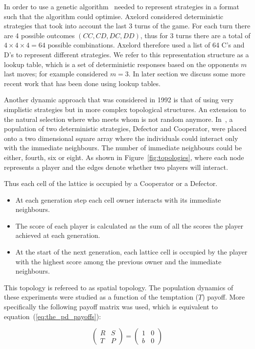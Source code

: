 \documentclass{article}
\theoremstyle{definition}
\begin{document}
In order to use a genetic algorithm~\cite{Axelrod1987} needed to represent strategies
in a format such that the algorithm could optimise. Axelord considered deterministic
strategies that took into account the last 3 turns of the game. For each turn
there are 4 possible outcomes \((CC, CD, DC, DD)\), thus for 3 turns there are a total
of \(4\times4\times4=64\) possible combinations. Axelord therefore used a list of 64 C's and D's
to represent different strategies. We refer to this representation structure as a
lookup table, which is a set of deterministic responses based on
the opponents \(m\) last moves; for example \cite{Axelrod1987} considered \(m=3\).
In later section we discuss some more recent work that has been done using lookup
tables.

Another dynamic approach that was considered in 1992 is that of using very simplistic
strategies but in more complex topological structures. An extension to the natural selection
where who meets whom is not random anymore. In~\cite{Nowak1992b}, a population
of two deterministic strategies, Defector and Cooperator, were placed onto a two
dimensional square array where the individuals could interact only with the immediate
neighbours. The number of immediate neighbours could be either, fourth, six or eight. As
shown in Figure~\ref{fig:topologies}, where each node represents a player and the
edges denote whether two players will interact.

Thus each cell of the lattice is occupied by a Cooperator or a Defector.
\begin{itemize}
    \item At each generation step each cell owner interacts with its immediate neighbours.
    \item The score of each player is calculated as the sum of all the scores the player
    achieved at each generation.
    \item At the start of the next generation, each lattice
    cell is occupied by the player with the highest score among the previous owner
    and the immediate neighbours.
\end{itemize}

This topology is refereed to as spatial topology. The population dynamics of these
experiments were studied as a function of the temptation (\(T\)) payoff.
More specifically the following payoff matrix was used, which is equivalent
to equation~(\ref{eq:the_pd_payoffs}):

\begin{equation}
    \begin{pmatrix}
    R & S \\ T & P
    \end{pmatrix}
    =
    \begin{pmatrix}
        1 & 0 \\ b & 0
    \end{pmatrix}
\end{equation}
\end{document}
